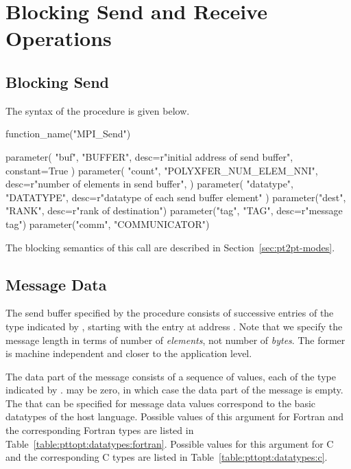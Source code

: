 \section{Blocking Send and Receive Operations}
\label{sec:pt2pt-basicsendrecv}

\subsection{Blocking Send}
\label{subsec:pt2pt-basicsend}

The syntax of the  procedure is given below.

\begin{mpi-binding}
    function_name("MPI_Send")

    parameter(
        "buf", "BUFFER", desc=r"initial address of send buffer", constant=True
    )
    parameter(
        "count",
        "POLYXFER_NUM_ELEM_NNI",
        desc=r"number of elements in send buffer",
    )
    parameter(
        "datatype", "DATATYPE", desc=r"datatype of each send buffer element"
    )
    parameter("dest", "RANK", desc=r"rank of destination")
    parameter("tag", "TAG", desc=r"message tag")
    parameter("comm", "COMMUNICATOR")
\end{mpi-binding}

The blocking semantics of this call are described in Section~\ref{sec:pt2pt-modes}.

\subsection{Message Data}
\label{subsec:pt2pt-messagedata}

The send buffer specified by the  procedure consists of
 successive entries of the type indicated by
, starting
with the entry at address .  Note that we specify the
message length
in terms of number of \emph{elements}, not number of \emph{bytes}.  The former is
machine independent and closer to the application level.

The data part of the message consists of a sequence of 
values, each of the type indicated by .
 may be zero,
in which case the data part of the message is empty.
The  that can be specified
for message data values correspond to
the basic datatypes of the host language.
Possible values of this argument for Fortran and the
corresponding Fortran types are listed
in Table~\ref{table:pttopt:datatypes:fortran}.
%
Possible values for this argument for C and the corresponding C
types are listed
in Table~\ref{table:pttopt:datatypes:c}.

